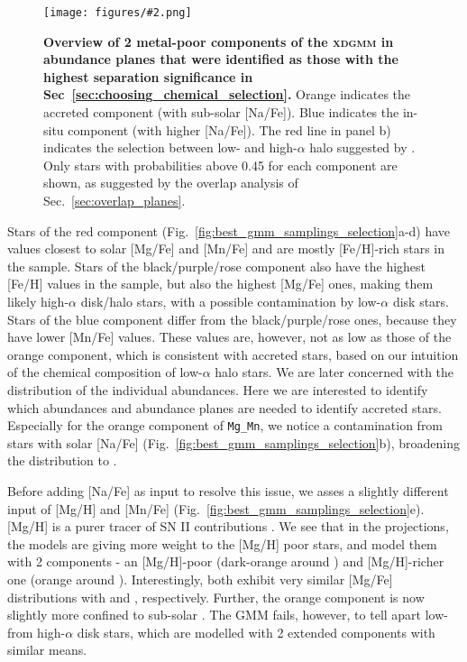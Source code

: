 \documentclass[fleqn,usenatbib]{mnras}
\newcommand{\codeicon}{{\faCloudDownload}}
\newcommand{\codelink}[1]{\href{https://github.com/svenbuder/buder_galah_accreted_chemistry/tree/main/figures/#1.ipynb}{\codeicon}\,\,}
\newcommand{\oscaption}[2]{\caption{#2 \codelink{#1}}}
\newcommand{\figuretextwidth}[4]{\begin{figure*} \centering \texttt{[image: figures/\#2.png]}\oscaption{#3}{#4}\label{fig:#2} \end{figure*}}
\begin{document}
\figuretextwidth{17cm}{nafe_mgmn_overview}{chronochemodynamic_comparison}{
\textbf{Overview of 2 metal-poor components of the \textsc{xdgmm} in abundance planes that were identified as those with the highest separation significance in Sec~\ref{sec:choosing_chemical_selection}.}
Orange indicates the accreted component (with sub-solar [Na/Fe]).
Blue indicates the in-situ component (with higher [Na/Fe]).
The red line in panel b) indicates the selection between low- and high-$\alpha$ halo suggested by \citet{Nissen2010}.
Only stars with probabilities above 0.45 for each component are shown, as suggested by the overlap analysis of Sec.~\ref{sec:overlap_planes}.
}

Stars of the red component (Fig.~\ref{fig:best_gmm_samplings_selection}a-d) have values closest to solar [Mg/Fe] and [Mn/Fe] and are mostly [Fe/H]-rich stars in the sample. Stars of the black/purple/rose component also have the highest [Fe/H] values in the sample, but also the highest [Mg/Fe] ones, making them likely high-$\alpha$ disk/halo stars, with a possible contamination by low-$\alpha$ disk stars. Stars of the blue component differ from the black/purple/rose ones, because they have lower [Mn/Fe] values. These values are, however, not as low as those of the orange component, which is consistent with accreted stars, based on our intuition of the chemical composition of low-$\alpha$ halo stars. We are later concerned with the distribution of the individual abundances. Here we are interested to identify which abundances and abundance planes are needed to identify accreted stars. Especially for the orange component of \texttt{Mg\_Mn}, we notice a contamination from stars with solar [Na/Fe] (Fig.~\ref{fig:best_gmm_samplings_selection}b), broadening the distribution to .

Before adding [Na/Fe] as input to resolve this issue, we asses a slightly different input of [Mg/H] and [Mn/Fe] (Fig.~\ref{fig:best_gmm_samplings_selection}e). [Mg/H] is a purer tracer of SN II contributions \citep{Kobayashi2020, Feuillet2021}. We see that in the projections, the models are giving more weight to the [Mg/H] poor stars, and model them with 2 components - an [Mg/H]-poor (dark-orange around ) and [Mg/H]-richer one (orange around ). Interestingly, both exhibit very similar [Mg/Fe] distributions with  and , respectively. Further, the orange component is now slightly more confined to sub-solar . The GMM fails, however, to tell apart low- from high-$\alpha$ disk stars, which are modelled with 2 extended components with similar means.
\end{document}
